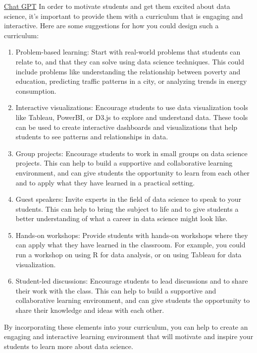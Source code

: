 \documentclass[
]{bxjsbook}
\providecommand{\tightlist}{%
  \setlength{\itemsep}{0pt}\setlength{\parskip}{0pt}}
\theoremstyle{definition}
\theoremstyle{definition}
\theoremstyle{definition}
\theoremstyle{definition}
\theoremstyle{remark}
\begin{document}
\protect\hyperlink{chatgpt}{Chat GPT} In order to motivate students and get them excited about data science, it's important to provide them with a curriculum that is engaging and interactive. Here are some suggestions for how you could design such a curriculum:

\begin{enumerate}
\def\labelenumi{\arabic{enumi}.}
\tightlist
\item
  Problem-based learning: Start with real-world problems that students can relate to, and that they can solve using data science techniques. This could include problems like understanding the relationship between poverty and education, predicting traffic patterns in a city, or analyzing trends in energy consumption.
\item
  Interactive visualizations: Encourage students to use data visualization tools like Tableau, PowerBI, or D3.js to explore and understand data. These tools can be used to create interactive dashboards and visualizations that help students to see patterns and relationships in data.
\item
  Group projects: Encourage students to work in small groups on data science projects. This can help to build a supportive and collaborative learning environment, and can give students the opportunity to learn from each other and to apply what they have learned in a practical setting.
\item
  Guest speakers: Invite experts in the field of data science to speak to your students. This can help to bring the subject to life and to give students a better understanding of what a career in data science might look like.
\item
  Hands-on workshops: Provide students with hands-on workshops where they can apply what they have learned in the classroom. For example, you could run a workshop on using R for data analysis, or on using Tableau for data visualization.
\item
  Student-led discussions: Encourage students to lead discussions and to share their work with the class. This can help to build a supportive and collaborative learning environment, and can give students the opportunity to share their knowledge and ideas with each other.
\end{enumerate}

By incorporating these elements into your curriculum, you can help to create an engaging and interactive learning environment that will motivate and inspire your students to learn more about data science.
\end{document}
